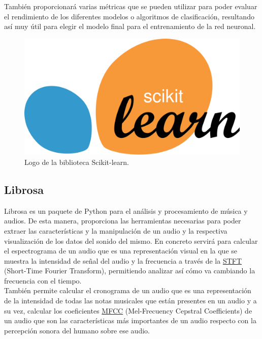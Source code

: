 También proporcionará varias métricas que se pueden utilizar para poder evaluar el rendimiento de los diferentes modelos o algoritmos de clasificación, resultando así muy útil para elegir el modelo final para el entrenamiento de la red neuronal.

\begin{figure}[H]
  \centering
  \includegraphics[scale=0.1]{figs/sklearn} %
  \caption{Logo de la biblioteca Scikit-learn.}
  \label{fig:sklearn}
\end{figure}

\subsection{Librosa}
\label{subsec:librosa}

Librosa es un paquete de Python para el análisis y procesamiento de música y audios. De esta manera, proporciona las herramientas necesarias para poder extraer las características y la manipulación de un audio y la respectiva visualización de los datos del sonido del mismo. En concreto servirá para calcular el espectrograma de un audio que es una representación visual en la que se muestra la intensidad de señal del audio y la frecuencia a través de la \hyperlink{STFT}{STFT} (Short-Time Fourier Transform), permitiendo analizar así cómo va cambiando la frecuencia con el tiempo.\\

También permite calcular el cronograma de un audio que es una representación de la intensidad de todas las notas musicales que están presentes en un audio y a su vez, calcular los coeficientes \hyperlink{MFCC}{MFCC} (Mel-Frecuency Cepstral Coefficients) de un audio que son las características más importantes de un audio respecto con la percepción sonora del humano sobre ese audio.\\

